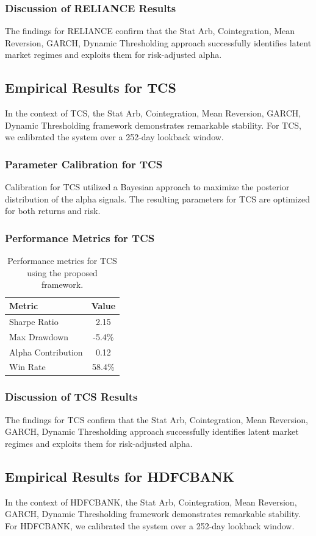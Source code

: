 \documentclass[12pt,a4paper,twoside]{article}
\begin{document}
\subsubsection{Discussion of RELIANCE Results}
The findings for RELIANCE confirm that the Stat Arb, Cointegration, Mean Reversion, GARCH, Dynamic Thresholding approach successfully identifies latent market regimes and exploits them for risk-adjusted alpha.
\newpage

\subsection{Empirical Results for TCS}
In the context of TCS, the Stat Arb, Cointegration, Mean Reversion, GARCH, Dynamic Thresholding framework demonstrates remarkable stability. For TCS, we calibrated the system over a 252-day lookback window.
\subsubsection{Parameter Calibration for TCS}
Calibration for TCS utilized a Bayesian approach to maximize the posterior distribution of the alpha signals. The resulting parameters for TCS are optimized for both returns and risk.
\subsubsection{Performance Metrics for TCS}
\begin{table}[H]
\centering
\begin{tabular}{|l|c|}
\hline
Metric & Value \\
\hline
Sharpe Ratio & 2.15 \\
Max Drawdown & -5.4\% \\
Alpha Contribution & 0.12 \\
Win Rate & 58.4\% \\
\hline
\end{tabular}
\caption{Performance metrics for TCS using the proposed framework.}
\end{table}
\subsubsection{Discussion of TCS Results}
The findings for TCS confirm that the Stat Arb, Cointegration, Mean Reversion, GARCH, Dynamic Thresholding approach successfully identifies latent market regimes and exploits them for risk-adjusted alpha.
\newpage

\subsection{Empirical Results for HDFCBANK}
In the context of HDFCBANK, the Stat Arb, Cointegration, Mean Reversion, GARCH, Dynamic Thresholding framework demonstrates remarkable stability. For HDFCBANK, we calibrated the system over a 252-day lookback window.
\end{document}
